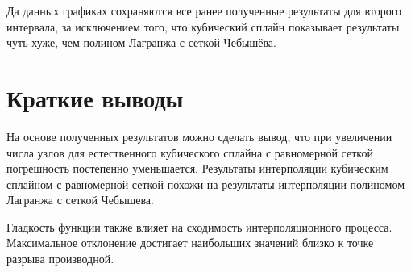 Да данных графиках сохраняются все ранее полученные результаты для второго интервала, за исключением того, что кубический сплайн показывает результаты чуть хуже, чем полином Лагранжа с сеткой Чебышёва.

\section{Краткие выводы}

На основе полученных результатов можно сделать вывод, что при увеличении числа узлов для естественного кубического сплайна с равномерной сеткой погрешность постепенно уменьшается. Результаты интерполяции кубическим сплайном с равномерной сеткой похожи на результаты интерполяции полиномом Лагранжа с сеткой Чебышева. 

Гладкость функции также влияет на сходимость интерполяционного процесса. Максимальное отклонение достигает наибольших значений близко к точке разрыва производной.



